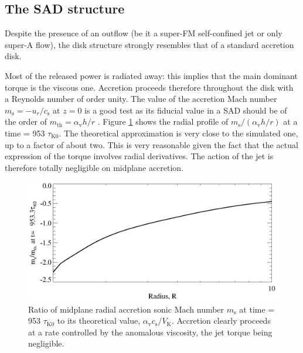 \documentclass{aa}
\begin{document}
\subsection{The SAD structure}

Despite the presence of an outflow (be it a super-FM self-confined jet or only super-A flow), the disk structure strongly resembles that of a standard accretion disk.

Most of the released power is radiated away: this implies that the main dominant torque is the viscous one. Accretion proceeds therefore throughout the disk with a Reynolds number of order unity. The
value of the accretion Mach number $m_\mathrm{s}= -u_r/c_\mathrm{s}$ at $z=0$ is a good test as its fiducial value in a SAD should be of the order of $m_\mathrm{th} = \alpha_\mathrm{v} h/r$ \citep{1994ApJ...423..736R}. Figure
\ref{fig:mach_acc} shows the radial profile of $m_\mathrm{s}/(\alpha_\mathrm{v} h/r)$ at a time = 953 $\tau_\mathrm{K0}$.  The theoretical approximation is very close to the simulated one, up to a factor of about two. This is
very reasonable given the fact that the actual expression of the torque involves radial derivatives. The action of the jet is therefore totally negligible on midplane accretion.

\begin{figure}
   \centering \includegraphics[width=\columnwidth]{12633f05.eps}
   \caption{Ratio of midplane radial accretion sonic Mach number $m_\mathrm{s}$ at time = 953 $\tau_\mathrm{K0}$ to its theoretical value, $\alpha_\mathrm{v} c_\mathrm{s} /V_\mathrm{K}$. Accretion clearly proceeds at a rate controlled by the
		anomalous viscosity, the jet torque being negligible. }
              \label{fig:mach_acc}%
    \end{figure}
\end{document}
